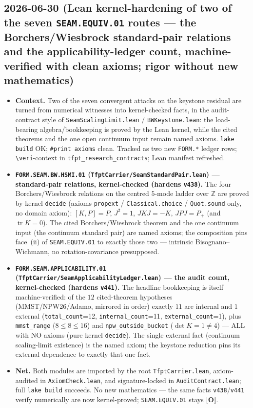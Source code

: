 \documentclass[11pt]{article}
\providecommand{\mO}{\textbf{[O]}}\providecommand{\mX}{\textbf{[X]}}
\begin{document}
\subsection*{2026-06-30 (Lean kernel-hardening of two of the seven \texttt{SEAM.EQUIV.01} routes --- the Borchers/Wiesbrock standard-pair relations and the applicability-ledger count, machine-verified with clean axioms; rigor without new mathematics)}
\begin{itemize}
\item \textbf{Context.} Two of the seven convergent attacks on the keystone residual are turned from numerical
witnesses into kernel-checked facts, in the audit-contract style of \texttt{SeamScalingLimit.lean} /
\texttt{BWKeystone.lean}: the load-bearing algebra/bookkeeping is proved by the Lean kernel, while the cited
theorems and the one open continuum input remain named axioms. \texttt{lake build} OK; \texttt{\#print axioms}
clean. Tracked as two new \texttt{FORM.*} ledger rows; \texttt{\textbackslash veri}-context in
\texttt{tfpt\_research\_contracts}; Lean manifest refreshed.
\item \textbf{\texttt{FORM.SEAM.BW.HSMI.01} (\texttt{TfptCarrier/SeamStandardPair.lean}) --- standard-pair
relations, kernel-checked (hardens \texttt{v438}).} The four Borchers/Wiesbrock relations on the centred
$5$-mode ladder over $\mathbb{Z}$ are proved by kernel \texttt{decide} (axioms \texttt{propext} /
\texttt{Classical.choice} / \texttt{Quot.sound} only, no domain axiom): $[K,P]{=}P$, $J^2{=}1$, $JKJ{=}{-}K$,
$JPJ{=}P_+$ (and $\operatorname{tr}K{=}0$). The cited Borchers/Wiesbrock theorem and the one continuum input
(the continuum standard pair) are named axioms; the composition pins face~(ii) of \texttt{SEAM.EQUIV.01} to
exactly those two --- intrinsic Bisognano--Wichmann, no rotation-covariance presupposed.
\item \textbf{\texttt{FORM.SEAM.APPLICABILITY.01} (\texttt{TfptCarrier/SeamApplicabilityLedger.lean}) --- the
audit count, kernel-checked (hardens \texttt{v441}).} The headline bookkeeping is itself machine-verified: of
the $12$ cited-theorem hypotheses (MMST/NPW26/Adamo, mirrored in order) exactly $11$ are internal and $1$
external (\texttt{total\_count}=12, \texttt{internal\_count}=11, \texttt{external\_count}=1), plus
\texttt{mmst\_range} ($8\le8\le16$) and \texttt{npw\_outside\_bucket} ($\det K{=}1\neq4$) --- ALL with NO axioms
(pure kernel \texttt{decide}). The single external fact (continuum scaling-limit existence) is the named axiom;
the keystone reduction pins its external dependence to exactly that one fact.
\item \textbf{Net.} Both modules are imported by the root \texttt{TfptCarrier.lean}, axiom-audited in
\texttt{AxiomCheck.lean}, and signature-locked in \texttt{AuditContract.lean}; full \texttt{lake build}
succeeds. No new mathematics --- the same facts \texttt{v438}/\texttt{v441} verify numerically are now
kernel-proved; \texttt{SEAM.EQUIV.01} stays \mO.
\end{itemize}
\end{document}

